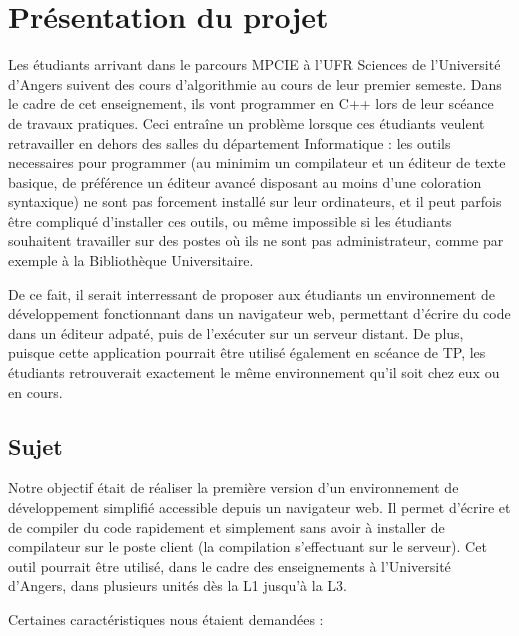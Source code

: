 \chapter{Présentation du projet}

\par Les étudiants arrivant dans le parcours MPCIE à l'UFR Sciences de l'Université d'Angers suivent des cours d'algorithmie au cours de leur premier semeste. Dans le cadre de cet enseignement, ils vont programmer en C++ lors de leur scéance de travaux pratiques. Ceci entraîne un problème lorsque ces étudiants veulent retravailler en dehors des salles du département Informatique : les outils necessaires pour programmer (au minimim un compilateur et un éditeur de texte basique, de préférence un éditeur avancé disposant au moins d'une coloration syntaxique) ne sont pas forcement installé sur leur ordinateurs, et il peut parfois être compliqué d'installer ces outils, ou même impossible si les étudiants souhaitent travailler sur des postes où ils ne sont pas administrateur, comme par exemple à la Bibliothèque Universitaire.
\par De ce fait, il serait interressant de proposer aux étudiants un environnement de développement fonctionnant dans un navigateur web, permettant d'écrire du code dans un éditeur adpaté, puis de l'exécuter sur un serveur distant. De plus, puisque cette application pourrait être utilisé également en scéance de TP, les étudiants retrouverait exactement le même environnement qu'il soit chez eux ou en cours.

\section{Sujet}

\par Notre objectif était de réaliser la première version d'un environnement de développement simplifié accessible depuis un navigateur web. Il permet d'écrire et de compiler du code rapidement et simplement sans avoir à installer de compilateur sur le poste client (la compilation s'effectuant sur le serveur). Cet outil pourrait être utilisé, dans le cadre des enseignements à l'Université d'Angers, dans plusieurs unités dès la L1 jusqu'à la L3. \\

\par Certaines caractéristiques nous étaient demandées :


